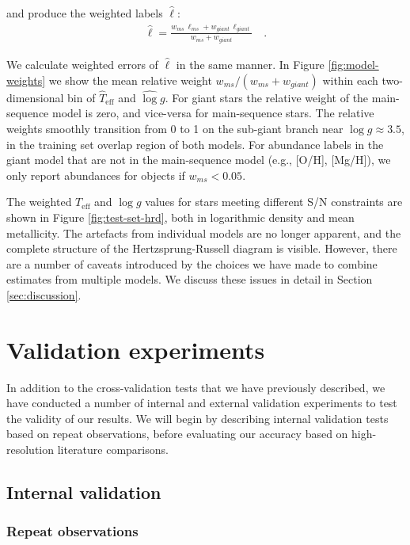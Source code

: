 \documentclass[preprint,trackchanges]{aastex}
\newcommand{\teff}{T_{\mathrm{eff}}}
\newcommand{\logg}{\log g}
\begin{document}
\noindent{}and produce the weighted labels $\hat\ell$:
\begin{eqnarray}
	\hat\ell = \frac{w_{ms}\,\ell_{ms} + w_{giant}\,\ell_{giant}}{w_{ms} + w_{giant}} \quad .
\end{eqnarray}

We calculate weighted errors of $\hat\ell$ in the same manner.  
In Figure \ref{fig:model-weights} we show the mean relative
weight $w_{ms}/(w_{ms} + w_{giant})$ within each two-dimensional bin of 
$\hat\teff$ and $\hat\logg$.  For giant stars the relative weight of 
the main-sequence model is zero, and vice-versa for main-sequence stars.
The relative weights smoothly transition from 0 to 1 on the sub-giant branch
near $\log{g} \approx 3.5$, in the training set overlap region of both models.
For abundance labels in the giant model that are not in the main-sequence
model (e.g., [O/H], [Mg/H]), we only report abundances for objects if
$w_{ms} < 0.05$.


The weighted $\teff$ and $\logg$ values for stars meeting different S/N 
constraints are shown in Figure \ref{fig:test-set-hrd}, both in logarithmic 
density and mean metallicity.  The artefacts from individual models are no 
longer apparent, and the complete structure of the Hertzsprung-Russell diagram
is visible.  However, there are a number of caveats introduced by the choices 
we have made to combine estimates from multiple models.  We discuss these 
issues in detail in Section \ref{sec:discussion}.


\section{Validation experiments}
\label{sec:validation}


In addition to the cross-validation tests that we have previously described, 
we have conducted a number of internal and external validation experiments to 
test the validity of our results.  We will begin by describing internal validation
tests based on repeat observations, before evaluating our accuracy based on
high-resolution literature comparisons.


\subsection{Internal validation}
\subsubsection{Repeat observations}
\label{sec:repeat-observations}
\end{document}
